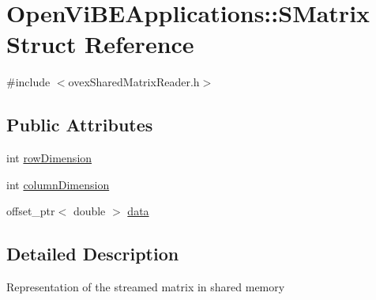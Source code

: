 \hypertarget{structOpenViBEApplications_1_1SMatrix}{
\section{OpenViBEApplications::SMatrix Struct Reference}
\label{structOpenViBEApplications_1_1SMatrix}
}


{\ttfamily \#include $<$ovexSharedMatrixReader.h$>$}

\subsection*{Public Attributes}
\begin{DoxyCompactItemize}
\item 
int \hyperlink{structOpenViBEApplications_1_1SMatrix_ac01b7e7a3b15eea20921a344bed3c5c6}{rowDimension}
\item 
int \hyperlink{structOpenViBEApplications_1_1SMatrix_a89840ca15bb5cd21e8e23482b16cc89a}{columnDimension}
\item 
offset\_\-ptr$<$ double $>$ \hyperlink{structOpenViBEApplications_1_1SMatrix_a21a4aac7ccb571434a2398588857b833}{data}
\end{DoxyCompactItemize}


\subsection{Detailed Description}
Representation of the streamed matrix in shared memory 


